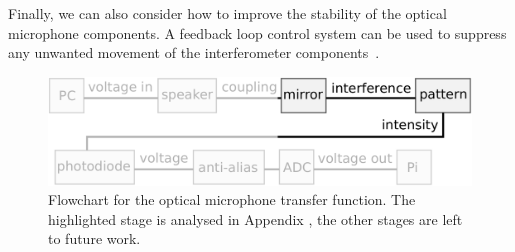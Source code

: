 \documentclass[paper-main.tex]{subfiles}
\begin{document}
Finally, we can also consider how to improve the stability of the optical microphone components.
A feedback loop control system can be used to suppress any unwanted movement of the interferometer components~\citep{abbott2017exploring, Sekiguchi:2016bmv, verhoeven2009robust}. 



\begin{figure}
	\includegraphics[width=.99\textwidth]{figures/pipeline_highlighted.pdf}
	\caption{
Flowchart for the optical microphone transfer function. 
The highlighted stage is analysed in Appendix , the other stages are left to future work. 
}
	\label{fig:pipeline_highlighted}
\end{figure}
\end{document}
